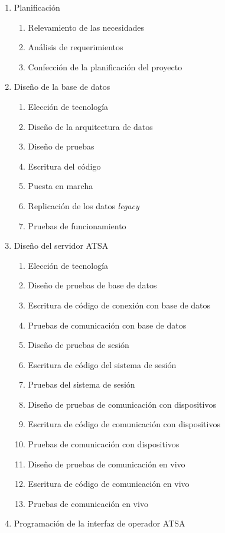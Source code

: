\documentclass[
12pt,
spanish,
singlespacing,
parskip,
headsepline,]{article}
\begin{document}
\begin{enumerate}
	\item Planificación
	\begin{enumerate}
		\item Relevamiento de las necesidades
		\item Análisis de requerimientos
		\item Confección de la planificación del proyecto
	\end{enumerate}
	\item Diseño de la base de datos
	\begin{enumerate}
		\item Elección de tecnología
		\item Diseño de la arquitectura de datos
		\item Diseño de pruebas
		\item Escritura del código
		\item Puesta en marcha
		\item Replicación de los datos \emph{legacy} 
		\item Pruebas de funcionamiento
	\end{enumerate}
	\item Diseño del servidor ATSA
	\begin{enumerate}
		\item Elección de tecnología
		\item Diseño de pruebas de base de datos
		\item Escritura de código de conexión con base de datos
		\item Pruebas de comunicación con base de datos
		\item Diseño de pruebas de sesión
		\item Escritura de código del sistema de sesión
		\item Pruebas del sistema de sesión
		\item Diseño de pruebas de comunicación con dispositivos
		\item Escritura de código de comunicación con dispositivos
		\item Pruebas de comunicación con dispositivos
		\item Diseño de pruebas de comunicación en vivo
		\item Escritura de código de comunicación en vivo
		\item Pruebas de comunicación en vivo
	\end{enumerate}
	\item Programación de la interfaz de operador ATSA

\end{enumerate}
\end{document}

